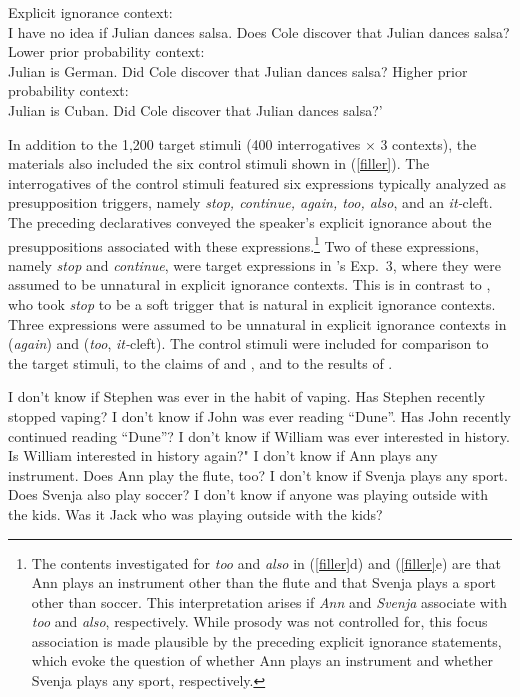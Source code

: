 \documentclass[11pt,fleqn]{article}
\newcommand{\6}{\mbox{$[\hspace*{-.6mm}[$}}
\newcommand{\9}{\mbox{$]\hspace*{-.6mm}]$}}
\newcommand{\citepos}[1]{\citeauthor{#1}'s \citeyear{#1}}
\begin{document}
\begin{exe}
\ex\label{sample}
\begin{xlist}
\ex Explicit ignorance context: \\ I have no idea if Julian dances salsa. Does Cole discover that Julian dances salsa?
\ex Lower prior probability context: \\ Julian is German. Did Cole discover that Julian dances salsa?
\ex Higher prior probability context: \\ Julian is Cuban. Did Cole discover that Julian dances salsa?'
\end{xlist}
\end{exe}

In addition to the 1,200 target stimuli (400 interrogatives $\times$ 3 contexts), the materials also included the six control stimuli shown in (\ref{filler}). The interrogatives of the control stimuli featured six expressions typically analyzed as presupposition triggers, namely {\em stop, continue, again, too, also}, and an {\em it-}cleft. The preceding declaratives conveyed the speaker's explicit ignorance about the presuppositions associated with these expressions.\footnote{The contents investigated for {\em too} and {\em also} in (\ref{filler}d) and (\ref{filler}e) are that Ann plays an instrument other than the flute and that Svenja plays a sport other than soccer. This interpretation arises if {\em Ann} and {\em Svenja} associate with {\em too} and {\em also}, respectively. While prosody was not controlled for, this focus association is made plausible by the preceding explicit ignorance statements, which evoke the question of whether Ann plays an instrument and whether Svenja plays any sport, respectively.} Two of these expressions, namely {\em stop} and {\em continue}, were target expressions in \citepos{mandelkern-etal2020} Exp.~3, where they were assumed to be unnatural in explicit ignorance contexts. This is in contrast to \citealt{simons01}, who took {\em stop} to be a soft trigger that is natural in explicit ignorance contexts. Three expressions were assumed to be unnatural in explicit ignorance contexts in \citealt{simons01} ({\em again}) and \citealt{abusch10} ({\em too}, {\em it-}cleft). The control stimuli were included for comparison to the target stimuli, to the claims of \citealt{simons01} and \citealt{abusch10}, and to the results of \citealt{mandelkern-etal2020}.

\begin{exe}
\ex\label{filler} 
\begin{xlist}
\ex I don't know if Stephen was ever in the habit of vaping. Has Stephen recently stopped vaping?
\ex I don't know if John was ever reading ``Dune''. Has John recently continued reading ``Dune''?
\ex I don't know if William was ever interested in history. Is William interested in history again?"
\ex I don't know if Ann plays any instrument. Does Ann play the flute, too?
\ex I don't know if Svenja plays any sport. Does Svenja also play soccer?
\ex I don't know if anyone was playing outside with the kids. Was it Jack who was playing outside with the kids?

\end{xlist}
\end{exe}
\end{document}

